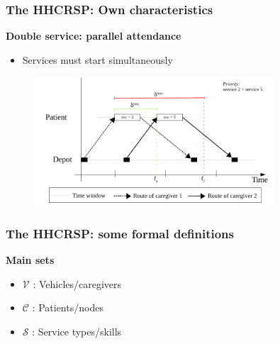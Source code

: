 \documentclass{beamer}
\begin{document}
\begin{frame}
   \frametitle{The HHCRSP: Own characteristics}
   \textbf{Double service: parallel attendance}
   \begin{itemize}
      \item Services must start simultaneously
   \end{itemize}

   \begin{figure}
      \centering
      \includegraphics[width=0.8\textwidth,page=2]{fig/sync-tsn2}
   \end{figure}
\end{frame}

\begin{frame}
   \frametitle{The HHCRSP: some formal definitions}
   \textbf{Main sets}
   \begin{itemize}
      \item $\mathcal{V}$ : Vehicles/caregivers
      \item $\mathcal{C}$ : Patients/nodes
      \item $\mathcal{S}$ : Service types/skills
   \end{itemize}

\end{frame}
\end{document}
